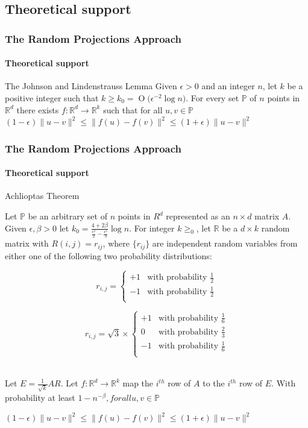 \documentclass{beamer}
\newcommand{\BigO}[1]{\ensuremath{\operatorname{O}\bigl(#1\bigr)}}
\begin{document}
\subsection{Theoretical support}
\begin{frame}
  	\frametitle{The Random Projections Approach}
  	\framesubtitle{Theoretical support}
  	\begin{block}{The Johnson and Lindenstrauss Lemma}
Given $\epsilon > 0$ and an integer $n$, let $k$ be a positive integer such that $k \geq k_{0} = \BigO{\epsilon^{-2}  \log n} $. For every set $\mathbb{P}$ of $n$ points in $\mathbb{R}^{d}$ there exists $f: \mathbb{R}^{d}  \rightarrow \mathbb{R}^{k}$ such that for all $u,v \in \mathbb{P}$\\
  	\bigskip
  	\centering
  	$(1-\epsilon)\lVert u-v \rVert^{2} \le \lVert f(u)-f(v) \rVert^{2}\le (1+\epsilon)\lVert u-v \rVert^{2}$\\
  	\end{block}
\end{frame}
\begin{frame}
  	\frametitle{The Random Projections Approach}
  	\framesubtitle{Theoretical support}
\begin{block}{Achlioptas Theorem}

  	  Let $\mathbb{P}$ be an arbitrary set of $n$ points in $R^{d}$ represented as an $n \times d$ matrix $A$. Given $\epsilon, \beta >0$ let $k_{0}=\frac{4+2\beta}{\frac{\epsilon^{2}}{2}-\frac{\epsilon^{3}}{3}}\log n$. For integer $k \ge_{0}$, let $\mathbb{R}$ be a $d \times k$ random matrix with $R(i,j)=r_{ij}$, where $\{r_{ij}\}$ are independent random variables from either one of the following two probability distributions:\\

\begin{minipage}[b]{0.45\linewidth}
\[
 r_{i,j} =
  \begin{cases}
   +1 & \text{with probability } \frac{1}{2} \\
  -1 & \text{with probability } \frac{1}{2} \\
  \end{cases}
\]  	  
\end{minipage}
\begin{minipage}[b]{0.45\linewidth}
\[
 r_{i,j} = \sqrt{3}\times 
  \begin{cases}
   +1 & \text{with probability } \frac{1}{6} \\
   0 & \text{with probability } \frac{2}{3} \\
  -1 & \text{with probability } \frac{1}{6} \\
  \end{cases}
\]
\end{minipage}\\
\bigskip
Let $E=\frac{1}{\sqrt{k}}AR$. Let $f: \mathbb{R}^{d}\rightarrow \mathbb{R}^{k}$ map the $i^{th}$ row of $A$ to the $i^{th}$ row of $E$.
\bigskip
With probability at least $1-n^{-\beta}, for all u, v \in \mathbb{P} $

\centering
$(1-\epsilon)\lVert u-v \rVert^{2} \le \lVert f(u)-f(v) \rVert^{2}\le (1+\epsilon)\lVert u-v \rVert^{2}$\\
\end{block}
\end{frame}
\end{document}
